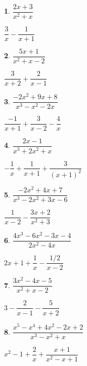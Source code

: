 \documentclass{amsbook}
\newtheorem{exc}{}
\newenvironment{ex}{\begin{exc}\normalfont}{\end{exc}}
\numberwithin{section}{chapter}
\numberwithin{equation}{chapter}
\begin{document}
\begin{multicols}{2}

\begin{ex}
	$\dfrac{2x+3}{x^2+x}$
	\begin{sol}
		$\dfrac{3}{x} - \dfrac{1}{x+1}$
	\end{sol}
\end{ex}

\begin{ex}
	$\dfrac{5x+1}{x^2+x-2}$
	\begin{sol}
		$\dfrac{3}{x+2} + \dfrac{2}{x-1}$
	\end{sol}
\end{ex}


\begin{ex}
	$\dfrac{-2x^2+9x+8}{x^3-x^2-2x}$
	\begin{sol}
		$\dfrac{-1}{x+1} + \dfrac{3}{x-2}-\dfrac{4}{x}$
	\end{sol}
\end{ex}


\begin{ex}
	$\dfrac{2x-1}{x^3+2x^2+x}$
	\begin{sol}
		$-\dfrac{1}{x}+\dfrac{1}{x+1}+ \dfrac{3}{(x+1)^2} $
	\end{sol}
\end{ex}

\begin{ex}
$\dfrac{-2x^2+4x+7}{x^3-2x^2+3x-6}$
	\begin{sol}
	$\dfrac{1}{x-2} - \dfrac{3x+2}{x^2+3}$
	\end{sol}
\end{ex}


\begin{ex}
	$\dfrac{4x^3-6x^2-3x-4}{2x^2-4x}$
	\begin{sol}
		$2x+1+\dfrac{1}{x}-\dfrac{1/2}{x-2}$
	\end{sol}
\end{ex}

\begin{ex}
	$\dfrac{3x^2-4x-5}{x^2+x-2}$
	\begin{sol}
		$3-\dfrac{2}{x-1}-\dfrac{5}{x+2}$
	\end{sol}
\end{ex}

\begin{ex}
	$\dfrac{x^5-x^4+4x^2-2x+2}{x^3-x^2+x}$
	\begin{sol}
		$x^2-1 +\dfrac{2}{x}+\dfrac{x+1}{x^2-x+1}$
	\end{sol}
\end{ex}


\end{multicols}
\end{document}
